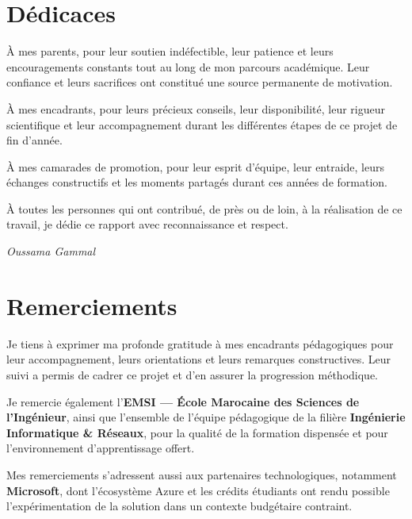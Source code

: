 \documentclass[11pt,a4paper]{report}
\begin{document}
\chapter*{Dédicaces}

À mes parents, pour leur soutien indéfectible, leur patience et leurs encouragements constants tout au long de mon parcours académique. Leur confiance et leurs sacrifices ont constitué une source permanente de motivation.

À mes encadrants, pour leurs précieux conseils, leur disponibilité, leur rigueur scientifique et leur accompagnement durant les différentes étapes de ce projet de fin d'année.

À mes camarades de promotion, pour leur esprit d'équipe, leur entraide, leurs échanges constructifs et les moments partagés durant ces années de formation.

À toutes les personnes qui ont contribué, de près ou de loin, à la réalisation de ce travail, je dédie ce rapport avec reconnaissance et respect.

\begin{flushright}
\textit{Oussama Gammal}
\end{flushright}

\chapter*{Remerciements}

Je tiens à exprimer ma profonde gratitude à mes encadrants pédagogiques pour leur accompagnement, leurs orientations et leurs remarques constructives. Leur suivi a permis de cadrer ce projet et d'en assurer la progression méthodique.

Je remercie également l'\textbf{EMSI --- École Marocaine des Sciences de l'Ingénieur}, ainsi que l'ensemble de l'équipe pédagogique de la filière \textbf{Ingénierie Informatique \& Réseaux}, pour la qualité de la formation dispensée et pour l'environnement d'apprentissage offert.

Mes remerciements s'adressent aussi aux partenaires technologiques, notamment \textbf{Microsoft}, dont l'écosystème Azure et les crédits étudiants ont rendu possible l'expérimentation de la solution dans un contexte budgétaire contraint.
\end{document}
